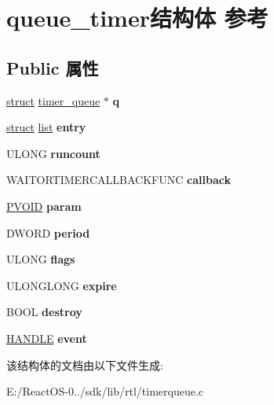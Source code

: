 \hypertarget{structqueue__timer}{}\section{queue\+\_\+timer结构体 参考}
\label{structqueue__timer}
\subsection*{Public 属性}
\begin{DoxyCompactItemize}
\item 
\mbox{\label{structqueue__timer_a3bf36861434690dc8dfe347cd20a7178}} 
\hyperlink{interfacestruct}{struct} \hyperlink{structtimer__queue}{timer\+\_\+queue} $\ast$ {\bfseries q}
\item 
\mbox{\label{structqueue__timer_af5b02ef21ad307b7e97cdd062d55b430}} 
\hyperlink{interfacestruct}{struct} \hyperlink{classlist}{list} {\bfseries entry}
\item 
\mbox{\label{structqueue__timer_a5c982b994bce9ddb688ef3c3d0395c10}} 
U\+L\+O\+NG {\bfseries runcount}
\item 
\mbox{\label{structqueue__timer_a5b0568a846c8457347a8e1bd990afcf2}} 
W\+A\+I\+T\+O\+R\+T\+I\+M\+E\+R\+C\+A\+L\+L\+B\+A\+C\+K\+F\+U\+NC {\bfseries callback}
\item 
\mbox{\label{structqueue__timer_a83cbb2e42f2fbf2b41acd80763a29006}} 
\hyperlink{interfacevoid}{P\+V\+O\+ID} {\bfseries param}
\item 
\mbox{\label{structqueue__timer_a3c8967e11c053ae95178c3e57ef2cd25}} 
D\+W\+O\+RD {\bfseries period}
\item 
\mbox{\label{structqueue__timer_add087929cc2bf03f565c1e123fa9997b}} 
U\+L\+O\+NG {\bfseries flags}
\item 
\mbox{\label{structqueue__timer_ae76b3ce3230b2f566556f4752aac47ed}} 
U\+L\+O\+N\+G\+L\+O\+NG {\bfseries expire}
\item 
\mbox{\label{structqueue__timer_a0a9147cb521d6848b9418d6d7680b990}} 
B\+O\+OL {\bfseries destroy}
\item 
\mbox{\label{structqueue__timer_aa0a3b56fabc7f7ab27b9b4ee07edb4bc}} 
\hyperlink{interfacevoid}{H\+A\+N\+D\+LE} {\bfseries event}
\end{DoxyCompactItemize}


该结构体的文档由以下文件生成\+:\begin{DoxyCompactItemize}
\item 
E\+:/\+React\+O\+S-\/0../sdk/lib/rtl/timerqueue.\+c\end{DoxyCompactItemize}
